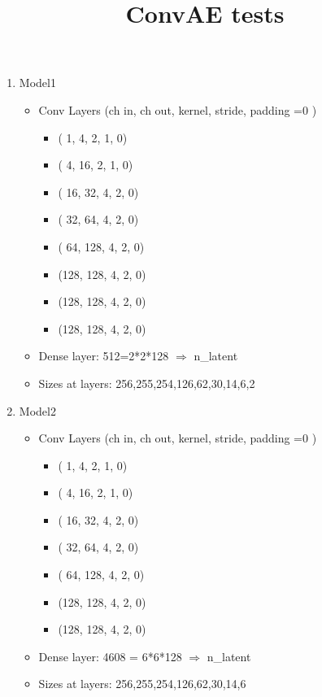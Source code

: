 \documentclass[USenglish]{article}
\newcommand{\1}{\begin{pmatrix}
		1\\
		1
\end{pmatrix}}
\begin{document}
	\title{ConvAE tests} 

\begin{enumerate}
	\item Model1
	\begin{itemize}
		\item Conv Layers (ch in, ch out, kernel, stride, padding =0 )
		\begin{itemize}
			\item (  1,   4, 2, 1, 0)
			\item (  4,  16, 2, 1, 0)
			\item ( 16,  32, 4, 2, 0)
			\item ( 32,  64, 4, 2, 0)
			\item ( 64, 128, 4, 2, 0)
			\item (128, 128, 4, 2, 0)
			\item (128, 128, 4, 2, 0)
			\item (128, 128, 4, 2, 0)
		\end{itemize}
		\item Dense layer: 512=2*2*128 $\Longrightarrow$ n\_latent
		\item Sizes at layers: 256,255,254,126,62,30,14,6,2
	\end{itemize}
	\item Model2
	\begin{itemize}
		\item Conv Layers (ch in, ch out, kernel, stride, padding =0 )
		\begin{itemize}
			\item (  1,   4, 2, 1, 0)
			\item (  4,  16, 2, 1, 0)
			\item ( 16,  32, 4, 2, 0)
			\item ( 32,  64, 4, 2, 0)
			\item ( 64, 128, 4, 2, 0)
			\item (128, 128, 4, 2, 0)
			\item (128, 128, 4, 2, 0)
		\end{itemize}
		\item Dense layer: 4608 = 6*6*128 $\Longrightarrow$ n\_latent
		\item Sizes at layers: 256,255,254,126,62,30,14,6
	\end{itemize}
	
\end{enumerate}
\end{document}
